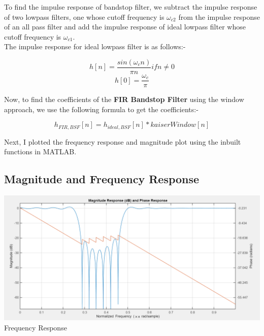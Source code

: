 \documentclass{article}
\begin{document}
To find the impulse response of bandstop filter, we subtract the impulse response of two lowpass filters, one whose cutoff frequency is $\omega_{c2}$ from the impulse response of an all pass filter and add the impulse response of ideal lowpass filter whose cutoff frequency is $\omega_{c1}$. \\
The impulse response for ideal lowpass filter is as follows:-

\begin{equation}
    h[n] = \frac{sin(\omega_{c}n)}{\pi n} if n \neq 0
\end{equation}
\begin{equation}
    h[0] = \frac{\omega_{c}}{\pi}
\end{equation}

Now, to find the coefficients of the \textbf{FIR Bandstop Filter} using the window approach, we use the following formula to get the coefficients:-

\[h_{FIR,BSF}[n] = h_{ideal,BSF}[n]*kaiserWindow[n]\]

Next, I plotted the frequency response and magnitude plot using the inbuilt functions in MATLAB.

\subsection{Magnitude and Frequency Response}
\begin{center}
    \includegraphics[scale=0.45]{bs_freq_fir.png}\\
    Frequency Response
\end{center}
\end{document}
